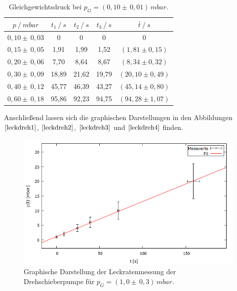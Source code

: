 \begin{table}[H]
\centering
\begin{tabular}{c|c|c|c|c}
	{$p \:/\: \si{mbar}$} & {$t_1 \:/\: \si{s} $} & {$t_2 \:/\: \si{s} $} & {$t_3 \:/\: \si{s} $} & {$\bar{t} \:/\: \si{s}$}\\
\midrule
$0,10 \pm \, 0,03$ &0 &0 &0 &0\\
$0,15 \pm \, 0,05$ &   1,91 &  1,99 &  1,52 & $(1,81 \pm 0,15)$\\
$0,20 \pm \, 0,06$ &   7,70  &  8,64 &  8,67 & $(8,34 \pm 0,32) $\\
$0,30 \pm \, 0,09$ &   18,89 &  21,62 &  19,79 & $(20,10 \pm 0,49) $\\
$0,40 \pm \, 0,12$ &   45,77 &  46,39 & 43,27 & $(45,14 \pm 0,80) $\\
$0,60 \pm \, 0,18$ &   95,86 &  92,23 &  94,75 & $(94,28 \pm 1,07) $\\
\end{tabular}
\caption{Gleichgewichtsdruck bei $p_G=(0,10 \pm \, 0,01) \, \si{mbar}$.}
\label{tab:leck_Dreh4}
\end{table}
Anschließend lassen sich die graphischen Darstellungen in den Abbildungen $\ref{leckdreh1}$, $\ref{leckdreh2}$, $\ref{leckdreh3}$ und $\ref{leckdreh4}$ finden.
\begin{figure}[H]
  \centering
  \includegraphics[width=14cm]{bilder/leckdrehfit1.png}
	\caption{Graphische Darstellung der Leckratenmessung der Drehschieberpumpe für $p_G=(1,0 \pm \, 0,3)  \, \si{mbar}$.}
  \label{leckdreh1}
\end{figure}
